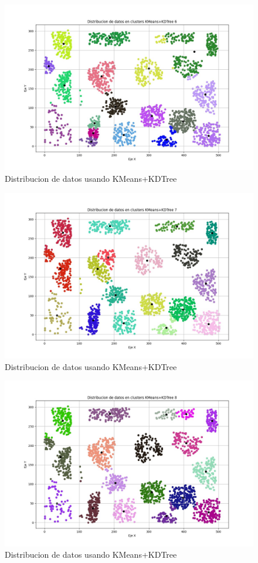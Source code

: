 \documentclass[conference]{IEEEtran}
\begin{document}
\begin{figure}[htbp]
    \centering
    \includegraphics[width=1\linewidth]{figures/kdtree6.jpeg} %
    \caption{Distribucion de datos usando KMeans+KDTree}
    \label{fig:kdtree6}
\end{figure}
\begin{figure}[htbp]
    \centering
    \includegraphics[width=1\linewidth]{figures/kdtree7.jpeg} %
    \caption{Distribucion de datos usando KMeans+KDTree}
    \label{fig:kdtree7}
\end{figure}
\begin{figure}[htbp]
    \centering
    \includegraphics[width=1\linewidth]{figures/kdtree8.jpeg} %
    \caption{Distribucion de datos usando KMeans+KDTree}
    \label{fig:kdtree8}
\end{figure}
\end{document}
